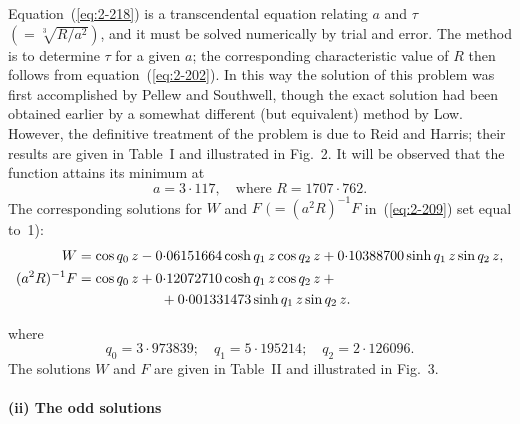 Equation~(\ref{eq:2-218}) is a transcendental equation relating $a$ and
$\tau$ $(= \sqrt[3]{R/a^2})$, and it must be solved numerically by trial and error.
The method is to determine $\tau$ for a given $a$; the corresponding characteristic
value of $R$ then follows from equation~(\ref{eq:2-202}). In this way the solution
of this problem was first accomplished by Pellew and Southwell, though
the exact solution had been obtained earlier by a somewhat different
(but equivalent) method by Low. However, the definitive treatment of
the problem is due to Reid and Harris; their results are given in Table~I
and illustrated in Fig.~2. It will be observed that the function attains
its minimum at
\begin{equation}
\label{eq:2-219}
a = 3{\cdot}117, \quad\text{where } R = 1707{\cdot}762.
\end{equation}
The corresponding solutions for $W$ and $F$ $(= (a^2R)^{-1}F$ in~(\ref{eq:2-209}) set
equal to~1):
\begin{align}
\label{eq:2-220}
W &= \cos q_0\,z - 0{\cdot}06151664\cosh q_1\,z\cos q_2\,z + 0{\cdot}10388700\sinh q_1\,z\sin q_2\,z, \notag\\
(a^2R)^{-1}F &= \cos q_0\,z + 0{\cdot}12072710\cosh q_1\,z\cos q_2\,z + {} \notag\\
&\qquad\qquad\qquad{} + 0{\cdot}001331473\sinh q_1\,z\sin q_2\,z.
\end{align}


where
\begin{equation}
\label{eq:2-221}
q_0 = 3{\cdot}973839; \quad q_1 = 5{\cdot}195214; \quad q_2 = 2{\cdot}126096.
\end{equation}
The solutions $W$ and $F$ are given in Table~II and illustrated in Fig.~3.

\paragraph{(ii) The odd solutions}

